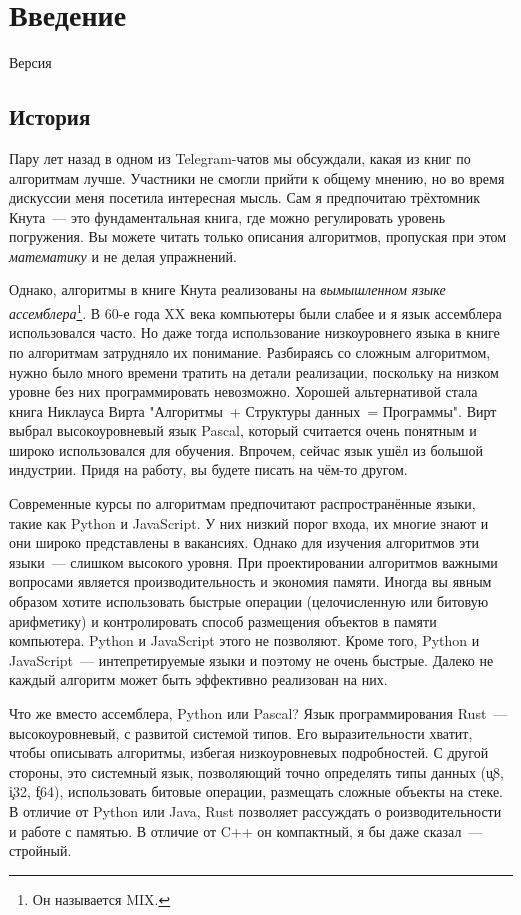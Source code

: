 \chapter{Введение}

Версия 

\section{История}

Пару лет назад в одном из Telegram-чатов мы обсуждали, какая из книг по алгоритмам лучше.
Участники не смогли прийти к общему мнению, но во время дискуссии меня посетила интересная мысль.
Сам я предпочитаю трёхтомник Кнута~--- это фундаментальная книга, где можно регулировать уровень погружения.
Вы можете читать только описания алгоритмов, пропуская при этом {\em математику} и не делая упражнений.

Однако, алгоритмы в книге Кнута реализованы на {\em вымышленном языке ассемблера}\footnote{Он называется MIX.}.
В 60-е года XX века компьютеры были слабее и я язык ассемблера использовался часто.
Но даже тогда использование низкоуровнего языка в книге по алгоритмам затрудняло их понимание.
Разбираясь со сложным алгоритмом, нужно было много времени тратить на детали реализации, поскольку на низком уровне без них программировать невозможно.
Хорошей альтернативой стала книга Никлауса Вирта "Алгоритмы\ + Структуры данных\ = Программы".
Вирт выбрал высокоуровневый язык Pascal, который считается очень понятным и широко использовался для обучения.
Впрочем, сейчас язык ушёл из большой индустрии.
Придя на работу, вы будете писать на чём-то другом.

Современные курсы по алгоритмам предпочитают распространённые языки, такие как Python и JavaScript.
У них низкий порог входа, их многие знают и они широко представлены в вакансиях.
Однако для изучения алгоритмов эти языки~--- слишком высокого уровня.
При проектировании алгоритмов важными вопросами является производительность и экономия памяти.
Иногда вы явным образом хотите использовать быстрые операции (целочисленную или битовую арифметику) и контролировать способ размещения объектов в памяти компьютера.
Python и JavaScript этого не позволяют.
Кроме того, Python и JavaScript~--- интепретируемые языки и поэтому не очень быстрые.
Далеко не каждый алгоритм может быть эффективно реализован на них.

Что же вместо ассемблера, Python или Pascal?
Язык программирования Rust~--- высокоуровневый, с развитой системой типов.
Его выразительности хватит, чтобы описывать алгоритмы, избегая низкоуровневых подробностей.
С другой стороны, это системный язык, позволяющий точно определять типы данных (\c{u8}, \c{i32}, \c{f64}), использовать битовые операции, размещать сложные объекты на стеке.
В отличие от Python или Java, Rust позволяет рассуждать о роизводительности и работе с памятью.
В отличие от C++ он компактный, я бы даже сказал~--- стройный.

